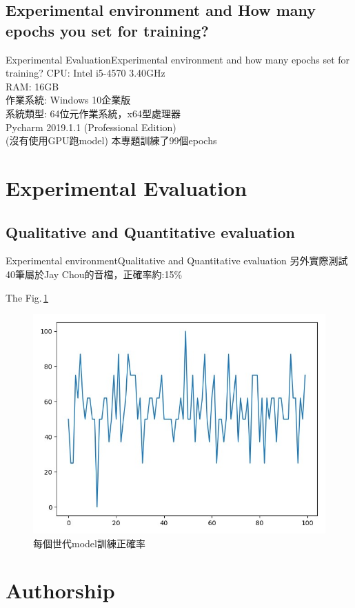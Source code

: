 \documentclass{beamer}
\begin{document}
\begin{CJK}{UTF8}{nkai}
\subsection{Experimental environment and How many epochs you set for training? }
\begin{frame}{Experimental Evaluation}{Experimental environment and how many epochs set for training?}
	CPU: Intel i5-4570 3.40GHz\\
	RAM: 16GB\\
	作業系統: Windows 10企業版\\
	系統類型: 64位元作業系統，x64型處理器\\
	Pycharm 2019.1.1 (Professional Edition)\\
	(沒有使用GPU跑model)\newline\newline
	本專題訓練了99個epochs
\end{frame}

\section{Experimental Evaluation}
\subsection{Qualitative and Quantitative evaluation}

\section*{Authorship}

\end{CJK}
\end{document}
